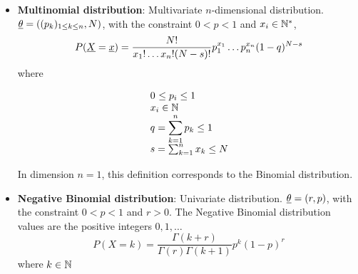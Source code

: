 {\begin{itemize}
\item {\bf Multinomial distribution}: Multivariate $n$-dimensional distribution. ${\underline{\theta}} = ((p_k)_{1 \leq k \leq n}, N)$, with the constraint $0<p<1$ and $x_i \in {\mathbb N}^*$,
\begin{equation}
\displaystyle P({\underline{X}} = {\underline{x}}) = \frac{N!}{x_1!\dots x_n! (N-s)!}p_1^{x_1}\dots p_n^{x_n}(1-q)^{N-s}
\end{equation}
where
\begin{equation}
\begin{array}{@{}l@{}}
0^{\strut}\leq p_i \leq 1 \\
x_i\in \Nset \\
\displaystyle q = \sum_{k=1}^n p_k \leq 1 \\
s=  \sum_{k=1}^n x_k \leq N_{\strut}
\end{array}
\end{equation}
In dimension $n=1$, this definition corresponds to the Binomial distribution.



\item {\bf Negative Binomial distribution}: Univariate distribution. ${\underline{\theta}} = (r,p)$, with the constraint $0<p<1$ and $r>0$. The Negative Binomial distribution values are the positive integers $0,1,\dots$
\begin{equation}
\displaystyle P(X = k) = \frac{\Gamma(k + r)}{\Gamma(r)\Gamma(k+1)}p^k(1-p)^r
\end{equation}
where $k\in{\mathbb N}$


\end{itemize}}
